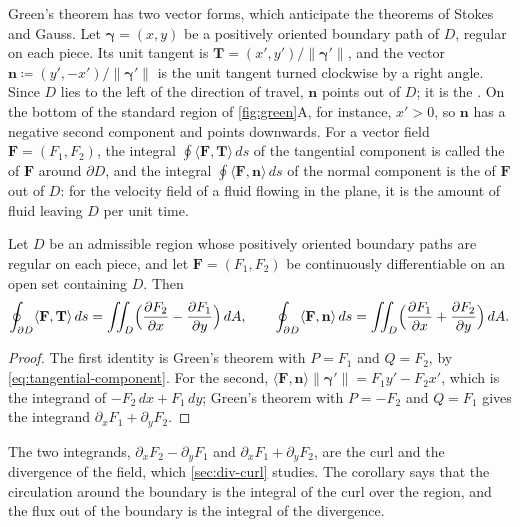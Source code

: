 Green's theorem has two vector forms, which anticipate the theorems of Stokes and Gauss. Let $\boldsymbol\gamma=(x,y)$ be a positively oriented boundary path of $D$, regular on each piece. Its unit tangent is $\mathbf T=(x',y')/\|\boldsymbol\gamma'\|$, and the vector $\mathbf n\coloneqq(y',-x')/\|\boldsymbol\gamma'\|$ is the unit tangent turned clockwise by a right angle. Since $D$ lies to the left of the direction of travel, $\mathbf n$ points out of $D$; it is the . On the bottom of the standard region of \cref{fig:green}A, for instance, $x'>0$, so $\mathbf n$ has a negative second component and points downwards. For a vector field $\mathbf F=(F_1,F_2)$, the integral $\oint\langle\mathbf F,\mathbf T\rangle\,ds$ of the tangential component is called the  of $\mathbf F$ around $\partial D$, and the integral $\oint\langle\mathbf F,\mathbf n\rangle\,ds$ of the normal component is the  of $\mathbf F$ out of $D$: for the velocity field of a fluid flowing in the plane, it is the amount of fluid leaving $D$ per unit time.

\begin{corollary}
\label{cor:green-vector}
Let $D$ be an admissible region whose positively oriented boundary paths are regular on each piece, and let $\mathbf F=(F_1,F_2)$ be continuously differentiable on an open set containing $D$. Then
\[
\oint_{\partial D}\langle\mathbf F,\mathbf T\rangle\,ds=\iint_D\Bigl(\frac{\partial F_2}{\partial x}-\frac{\partial F_1}{\partial y}\Bigr)\,dA,\qquad\oint_{\partial D}\langle\mathbf F,\mathbf n\rangle\,ds=\iint_D\Bigl(\frac{\partial F_1}{\partial x}+\frac{\partial F_2}{\partial y}\Bigr)\,dA .
\]
\end{corollary}

\begin{proof}
The first identity is Green's theorem with $P=F_1$ and $Q=F_2$, by \eqref{eq:tangential-component}. For the second, $\langle\mathbf F,\mathbf n\rangle\|\boldsymbol\gamma'\|=F_1y'-F_2x'$, which is the integrand of $-F_2\,dx+F_1\,dy$; Green's theorem with $P=-F_2$ and $Q=F_1$ gives the integrand $\partial_xF_1+\partial_yF_2$.
\end{proof}

The two integrands, $\partial_xF_2-\partial_yF_1$ and $\partial_xF_1+\partial_yF_2$, are the curl and the divergence of the field, which \cref{sec:div-curl} studies. The corollary says that the circulation around the boundary is the integral of the curl over the region, and the flux out of the boundary is the integral of the divergence.

